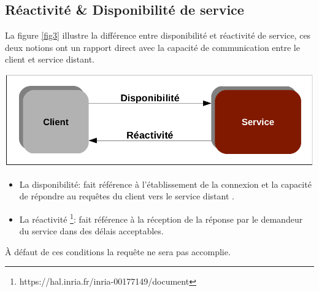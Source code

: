 \documentclass[12pt, a4paper, openany]{report}
\begin{document}
  \subsection{Réactivité \& Disponibilité de service}
   
   La figure \ref{fig3} illustre la différence entre disponibilité et réactivité de service, ces deux notions ont un rapport direct avec la capacité de communication entre le client et service distant.
   
   \begin{center}
     \includegraphics[scale=0.4]{reactivite_disponibilite_service_3.png}
     \label{fig3}
   \end{center}
   
   \begin{itemize}
      \item La disponibilité: fait référence à l’établissement de la connexion et la capacité de répondre au requêtes du client vers le service distant \cite{refbibDispo}.
      \item La réactivité \footnote{https://hal.inria.fr/inria-00177149/document}: fait référence à la réception de la réponse par le demandeur du service dans des délais acceptables. 
  \end{itemize}
  
  À défaut de ces conditions la requête ne sera pas accomplie.
  
\end{document}
